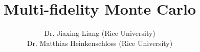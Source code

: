\documentclass{beamer}
\title[AMSC 663 Advanced Scientific Computing I]{\Large  
Multi-fidelity Monte Carlo}
\author[Jiaxing Liang]{\large Dr. Jiaxing Liang (Rice University)\\
Dr. Matthias Heinkenschloss (Rice University)}
\begin{document}
\frame{\titlepage }





            

    

    





            
\end{document}
